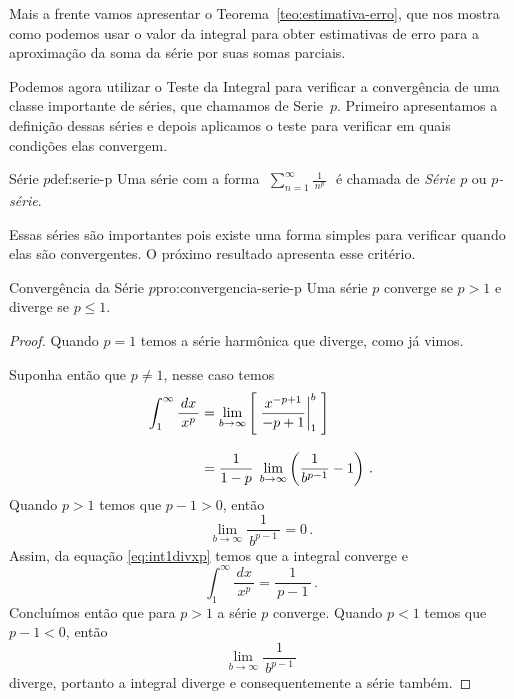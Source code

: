 Mais a frente vamos apresentar o Teorema~\ref{teo:estimativa-erro},
que nos mostra como podemos usar o valor da integral para obter estimativas
de erro para a aproximação da soma da série por suas somas parciais.

Podemos agora utilizar o Teste da Integral para verificar a convergência
de uma classe importante de séries, que chamamos de Serie~$p$. Primeiro
apresentamos a definição dessas séries e depois aplicamos o teste para
verificar em quais condições elas convergem.

\begin{definicao}{Série $p$}{def:serie-p}
  Uma série com a forma
  \(\;
    \sum_{n=1}^\infty \frac{1}{\,n^p\,}
  \;\)
  é chamada de \emph{Série $p$} ou \emph{$p$-série}.
\end{definicao}

Essas séries são importantes pois existe uma forma simples para verificar
quando elas são convergentes. O próximo resultado apresenta esse critério.

\begin{proposicao}{Convergência da Série $p$}{pro:convergencia-serie-p}
  Uma série $p$ converge se $p>1$ e diverge se $p\leq 1$.
\end{proposicao}
\begin{proof}
  Quando $p=1$ temos a série harmônica que diverge, como já vimos.

  Suponha então que $p\neq 1$, nesse caso temos
  \begin{align}
    \int_1^\infty\frac{\,dx\,}{x^p}
         & = \lim_{b\to \infty}\left[\;\frac{x^{-p+1}}{-p+1}\bigg\rvert_{1}^{b} \; \right] \nonumber \\[3mm]
         & = \frac{1}{1-p} \;\lim_{b\to \infty}\left(\frac{1}{b^{p-1}}-1\right)   \,.
         \label{eq:int1divxp}
  \end{align}
  Quando $p>1$ temos que $p-1>0$, então
  \[
    \lim_{b\to\infty} \frac{1}{\,b^{p-1}\,} = 0      \,.
  \]
  Assim, da equação \eqref{eq:int1divxp} temos que a integral converge e
  \[
    \int_1^\infty\frac{\,dx\,}{x^p}=\frac{1}{\,p-1\,}     \,.
  \]
  Concluímos então que para $p>1$ a série $p$ converge.
  Quando $p<1$ temos que $p-1<0$, então
  \[
   \lim_{b\to\infty} \frac{1}{\,b^{p-1}\,}
  \]
  diverge, portanto a integral diverge e consequentemente a série também.
\end{proof}

